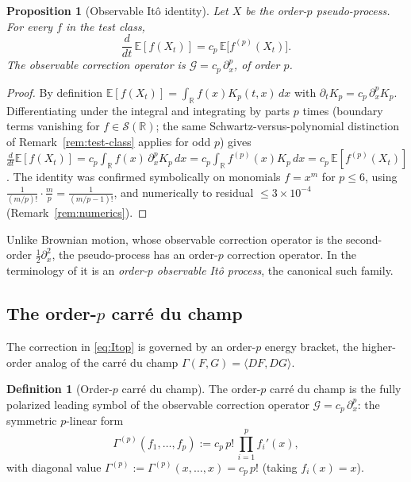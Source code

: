 \documentclass[11pt,reqno]{amsart}
\theoremstyle{plain}
\newtheorem{proposition}[theorem]{Proposition}
\theoremstyle{definition}
\newtheorem{definition}[theorem]{Definition}
\newcommand{\E}{\mathbb{E}}
\newcommand{\R}{\mathbb{R}}
\newcommand{\Schw}{\mathcal{S}}
\begin{document}
\begin{proposition}[Observable It\^o identity]
\label{prop:obs-ito}
Let $X$ be the order-$p$ pseudo-process. For every $f$ in the test class,
\begin{equation}
\label{eq:obs-ito-p}
\frac{d}{dt}\,\E[f(X_t)] = c_p\,\E\bigl[f^{(p)}(X_t)\bigr].
\end{equation}
The observable correction operator is $\mathcal G = c_p\,\partial_x^p$, of order $p$.
\end{proposition}

\begin{proof}
By definition $\E[f(X_t)] = \int_\R f(x) K_p(t,x)\, dx$ with $\partial_t K_p = c_p\,\partial_x^p K_p$. Differentiating under the integral and integrating by parts $p$ times (boundary terms vanishing for $f \in \Schw(\R)$; the same Schwartz-versus-polynomial distinction of Remark~\ref{rem:test-class} applies for odd $p$) gives $\frac{d}{dt}\E[f(X_t)] = c_p\int_\R f(x)\,\partial_x^p K_p\, dx = c_p\int_\R f^{(p)}(x) K_p\, dx = c_p\,\E[f^{(p)}(X_t)]$. The identity was confirmed symbolically on monomials $f=x^m$ for $p \leq 6$, using $\tfrac{1}{(m/p)!}\cdot\tfrac{m}{p} = \tfrac{1}{(m/p-1)!}$, and numerically to residual $\leq 3\times10^{-4}$ (Remark~\ref{rem:numerics}).
\end{proof}

Unlike Brownian motion, whose observable correction operator is the second-order $\tfrac12\partial_x^2$, the pseudo-process has an order-$p$ correction operator. In the terminology of \cite{operatorDerivativeI} it is an \emph{order-$p$ observable It\^o process}, the canonical such family.

\subsection{The order-\texorpdfstring{$p$}{p} carr\'e du champ}

The correction in \eqref{eq:Itop} is governed by an order-$p$ energy bracket, the higher-order analog of the carr\'e du champ $\Gamma(F,G) = \langle DF, DG\rangle$.

\begin{definition}[Order-$p$ carr\'e du champ]
\label{def:carre-p}
The order-$p$ carr\'e du champ is the fully polarized leading symbol of the observable correction operator $\mathcal G = c_p\,\partial_x^p$: the symmetric $p$-linear form
\begin{equation}
\Gamma^{(p)}(f_1,\ldots,f_p) := c_p\, p!\, \prod_{i=1}^p f_i'(x),
\end{equation}
with diagonal value $\Gamma^{(p)} := \Gamma^{(p)}(x,\ldots,x) = c_p\, p!$ (taking $f_i(x)=x$).
\end{definition}
\end{document}
